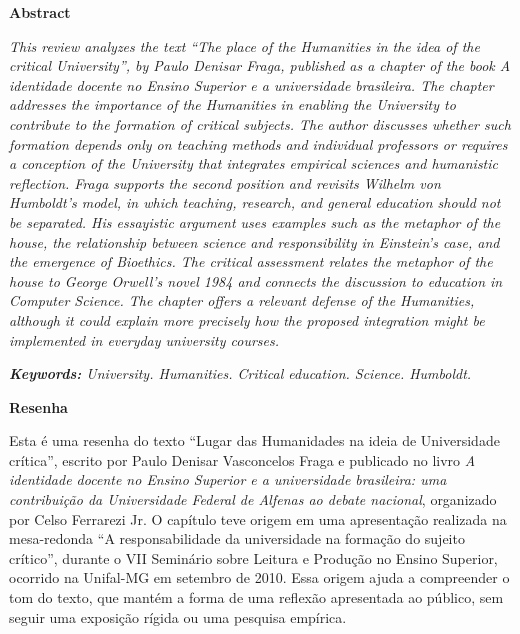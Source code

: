 \documentclass[12pt,a4paper]{article}
\begin{document}
\noindent\textbf{Abstract}\par
\noindent\setlength{\parindent}{0pt}%
\textit{This review analyzes the text ``The place of the Humanities in the idea of the critical University'', by Paulo Denisar Fraga, published as a chapter of the book A identidade docente no Ensino Superior e a universidade brasileira. The chapter addresses the importance of the Humanities in enabling the University to contribute to the formation of critical subjects. The author discusses whether such formation depends only on teaching methods and individual professors or requires a conception of the University that integrates empirical sciences and humanistic reflection. Fraga supports the second position and revisits Wilhelm von Humboldt's model, in which teaching, research, and general education should not be separated. His essayistic argument uses examples such as the metaphor of the house, the relationship between science and responsibility in Einstein's case, and the emergence of Bioethics. The critical assessment relates the metaphor of the house to George Orwell's novel 1984 and connects the discussion to education in Computer Science. The chapter offers a relevant defense of the Humanities, although it could explain more precisely how the proposed integration might be implemented in everyday university courses.}

\vspace{6pt}
\noindent\textit{\textbf{Keywords:} University. Humanities. Critical education. Science. Humboldt.}
\setlength{\parindent}{1.25cm}

\vspace{18pt}

\begin{center}
\textbf{\large Resenha}
\end{center}
\vspace{6pt}

Esta é uma resenha do texto ``Lugar das Humanidades na ideia de Universidade crítica'', escrito por Paulo Denisar Vasconcelos Fraga e publicado no livro \textit{A identidade docente no Ensino Superior e a universidade brasileira: uma contribuição da Universidade Federal de Alfenas ao debate nacional}, organizado por Celso Ferrarezi Jr. O capítulo teve origem em uma apresentação realizada na mesa-redonda ``A responsabilidade da universidade na formação do sujeito crítico'', durante o VII Seminário sobre Leitura e Produção no Ensino Superior, ocorrido na Unifal-MG em setembro de 2010. Essa origem ajuda a compreender o tom do texto, que mantém a forma de uma reflexão apresentada ao público, sem seguir uma exposição rígida ou uma pesquisa empírica.
\end{document}
